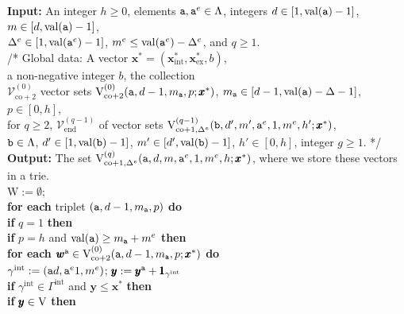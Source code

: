 \documentclass[12pt]{article}
\newcommand{\intt}{\mathrm{int}}
\newcommand{\ex}{\mathrm{ex}}
\newcommand{\co}{\mathrm{co}}
\newcommand{\V}{{\rm V}}
\newcommand{\ta}{{\tt a}}
\newcommand{\tb}{{\tt b}}
\newcommand{\w}{\pmb{w}}
\newcommand{\y}{\pmb{y}}
\newcommand{\x}{\pmb{x}}
\newcommand{\1}{\pmb{1}}
\newcommand{\0}{\pmb{0}}
\newcommand{\val}{\mathrm{val}}
\newcommand{\en}{\mathrm{end}}
\newcommand{\W}{\mathrm{W}}
\newcommand{\Vv}{\mathcal{V}}
\begin{document}
\begin{tabbing}
{\bf Input:}
An integer $h\geq 0$, elements  
$\ta, \ta^{e} \in \Lambda$, integers
$d  \in [1, \val(\ta) - 1]$, 
$m\in [d,\val(\ta)-1]$,  \+ \\
$\Delta^e \in [1, \val(\ta^e) -1] $, 
$m^e \leq \val(\ta^e) - \Delta^e$,
and $q \geq 1$.\- \\
\hspace{3mm}  /* Global data: A vector $\x^* = (\x^*_{\intt}, \x^*_{\ex}, b)$, \+ \\
a non-negative integer $b$,
                 the collection \\
                 $\Vv_{\co+ 2}^{(0)}$  vector sets 
                 $\V_{\co + 2}^{(0)}(\ta, d-1, m_{\ta}, p; 
                 \x^*)$, 
                 $m_{\ta} \in [d-1, \val(\ta) -\Delta -1]$, 
                 $p \in [0,h]$,\\
                 for $q \geq 2$, 
                 $\Vv_{\en}^{(q-1)}$ of vector sets  
                 $\V_{\co+1, \Delta^e}^{(q-1)}
                 (\tb, d', m', \ta^e, 1, m^e, h'; \x^*)$, \\
                 $\tb \in \Lambda$,
                  $d' \in [1, \val(\tb)-1]$, 
                  $m' \in [d', \val(\tb) - 1]$, 
                  $h' \in [0, h]$, integer $g \geq 1$. */ \- \\
{\bf Output:} The set $\V_{\co+1, \Delta^e}^{(q)}(\ta, d, m, \ta^e, 1, m^e, h; \x^*)$, where 
we store these vectors in a trie. \\
$\W := \emptyset$; \\
{\bf for each} triplet $(\ta, d-1, m_{\ta}, p)$ {\bf do} \+ \\
	{\bf if} $q = 1$ {\bf then}\+ \\
		{\bf if} $p = h$ and 
	     $\val(\ta) \geq m_{\ta} + m^e$ {\bf then} \+ \\
	     	{\bf for each} $\w^{\ta}  \in 
                      \V_{\co +2}^{(0)}(\ta, d-1,m_{\ta}, p; \x^*)$ 
                      {\bf do} \+\\                
				$\gamma^{\intt} := (\ta d, \ta^e 1, m^e )$; 
				$\y := \y^{\ta} + \1_{\gamma^{\intt}}$\\
				  {\bf if}  $\gamma^{\intt} \in \Gamma^{\intt}$ and 
						$\y \leq \x^*$ {\bf then}\+ \\
						                     {\bf if} $\y \in 
                     \V$ {\bf then} \+ \\
                              

\end{tabbing}
\end{document}
